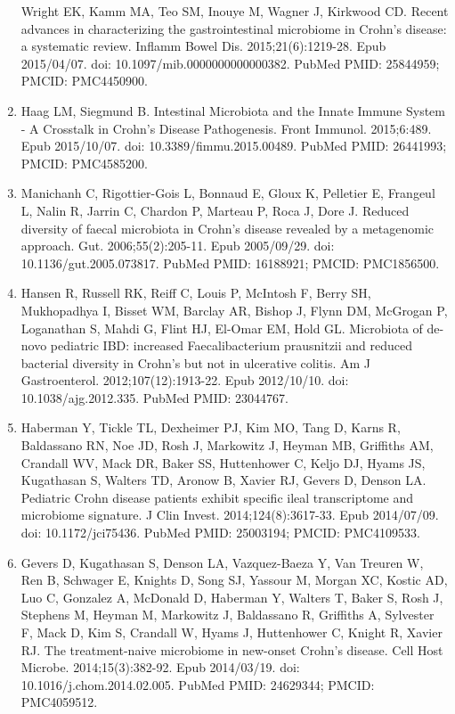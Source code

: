 \documentclass[11pt,]{article}
\begin{document}
\begin{enumerate}
  Wright EK, Kamm MA, Teo SM, Inouye M, Wagner J, Kirkwood CD. Recent
  advances in characterizing the gastrointestinal microbiome in Crohn's
  disease: a systematic review. Inflamm Bowel Dis. 2015;21(6):1219-28.
  Epub 2015/04/07. doi: 10.1097/mib.0000000000000382. PubMed PMID:
  25844959; PMCID: PMC4450900.
\item
  Haag LM, Siegmund B. Intestinal Microbiota and the Innate Immune
  System - A Crosstalk in Crohn's Disease Pathogenesis. Front Immunol.
  2015;6:489. Epub 2015/10/07. doi: 10.3389/fimmu.2015.00489. PubMed
  PMID: 26441993; PMCID: PMC4585200.
\item
  Manichanh C, Rigottier-Gois L, Bonnaud E, Gloux K, Pelletier E,
  Frangeul L, Nalin R, Jarrin C, Chardon P, Marteau P, Roca J, Dore J.
  Reduced diversity of faecal microbiota in Crohn's disease revealed by
  a metagenomic approach. Gut. 2006;55(2):205-11. Epub 2005/09/29. doi:
  10.1136/gut.2005.073817. PubMed PMID: 16188921; PMCID: PMC1856500.
\item
  Hansen R, Russell RK, Reiff C, Louis P, McIntosh F, Berry SH,
  Mukhopadhya I, Bisset WM, Barclay AR, Bishop J, Flynn DM, McGrogan P,
  Loganathan S, Mahdi G, Flint HJ, El-Omar EM, Hold GL. Microbiota of
  de-novo pediatric IBD: increased Faecalibacterium prausnitzii and
  reduced bacterial diversity in Crohn's but not in ulcerative colitis.
  Am J Gastroenterol. 2012;107(12):1913-22. Epub 2012/10/10. doi:
  10.1038/ajg.2012.335. PubMed PMID: 23044767.
\item
  Haberman Y, Tickle TL, Dexheimer PJ, Kim MO, Tang D, Karns R,
  Baldassano RN, Noe JD, Rosh J, Markowitz J, Heyman MB, Griffiths AM,
  Crandall WV, Mack DR, Baker SS, Huttenhower C, Keljo DJ, Hyams JS,
  Kugathasan S, Walters TD, Aronow B, Xavier RJ, Gevers D, Denson LA.
  Pediatric Crohn disease patients exhibit specific ileal transcriptome
  and microbiome signature. J Clin Invest. 2014;124(8):3617-33. Epub
  2014/07/09. doi: 10.1172/jci75436. PubMed PMID: 25003194; PMCID:
  PMC4109533.
\item
  Gevers D, Kugathasan S, Denson LA, Vazquez-Baeza Y, Van Treuren W, Ren
  B, Schwager E, Knights D, Song SJ, Yassour M, Morgan XC, Kostic AD,
  Luo C, Gonzalez A, McDonald D, Haberman Y, Walters T, Baker S, Rosh J,
  Stephens M, Heyman M, Markowitz J, Baldassano R, Griffiths A,
  Sylvester F, Mack D, Kim S, Crandall W, Hyams J, Huttenhower C, Knight
  R, Xavier RJ. The treatment-naive microbiome in new-onset Crohn's
  disease. Cell Host Microbe. 2014;15(3):382-92. Epub 2014/03/19. doi:
  10.1016/j.chom.2014.02.005. PubMed PMID: 24629344; PMCID: PMC4059512.

\end{enumerate}
\end{document}
